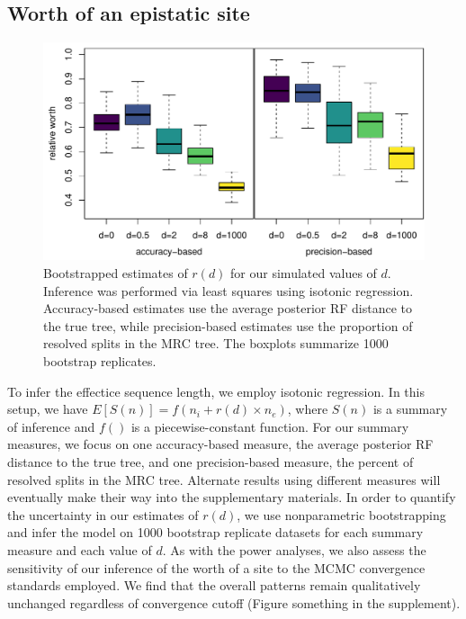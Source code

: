 \documentclass[11pt]{article}
\begin{document}
\subsection*{Worth of an epistatic site}

\begin{figure}
  \centering
  \includegraphics[width=\textwidth]{figures/relative_worth.pdf}
  \caption{
    Bootstrapped estimates of $r(d)$ for our simulated values of $d$.
    Inference was performed via least squares using isotonic regression.
    Accuracy-based estimates use the average posterior RF distance to the true tree, while precision-based estimates use the proportion of resolved splits in the MRC tree.
    The boxplots summarize 1000 bootstrap replicates.
  }
  \label{fig:worth}
\end{figure}

To infer the effectice sequence length, we employ isotonic regression.
In this setup, we have $E[S(n)] = f(n_i + r(d) \times n_e)$, where $S(n)$ is a summary of inference and $f()$ is a piecewise-constant function.
For our summary measures, we focus on one accuracy-based measure, the average posterior RF distance to the true tree, and one precision-based measure, the percent of resolved splits in the MRC tree.
Alternate results using different measures will eventually make their way into the supplementary materials.
In order to quantify the uncertainty in our estimates of $r(d)$, we use nonparametric bootstrapping \citep{efron1992bootstrap} and infer the model on 1000 bootstrap replicate datasets for each summary measure and each value of $d$.
As with the power analyses, we also assess the sensitivity of our inference of the worth of a site to the MCMC convergence standards employed.
We find that the overall patterns remain qualitatively unchanged regardless of convergence cutoff (Figure something in the supplement).
\end{document}
